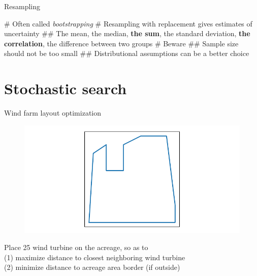 \documentclass[12pt, aspectratio=149]{beamer}
\theoremstyle{plain}
\begin{document}
\begin{frame}[fragile]{Resampling}
	
	\begin{easylist}[itemize]
		# Often called \emph{bootstrapping}
		# Resampling with replacement gives estimates of uncertainty
		## The mean, the median, \textbf{the sum}, the standard deviation, \textbf{the correlation}, the difference between two groups
		# Beware
		## Sample size should not be too small
		## Distributional assumptions can be a better choice
	\end{easylist}
\end{frame}


\section{Stochastic search}

\begin{frame}[fragile]{Wind farm layout optimization}
\vspace*{-1em}
\begin{center}
 \begin{figure}
    	\centering
    	\includegraphics[width=0.99\linewidth]{figures/windfarm}
 \end{figure}
 \end{center}
\vspace*{-2em}
\begin{center}
Place 25 wind turbine on the acreage, so as to\\
(1) maximize distance to closest neighboring wind turbine \\
(2) minimize distance to acreage area border (if outside)
\end{center}
\end{frame}
\end{document}
